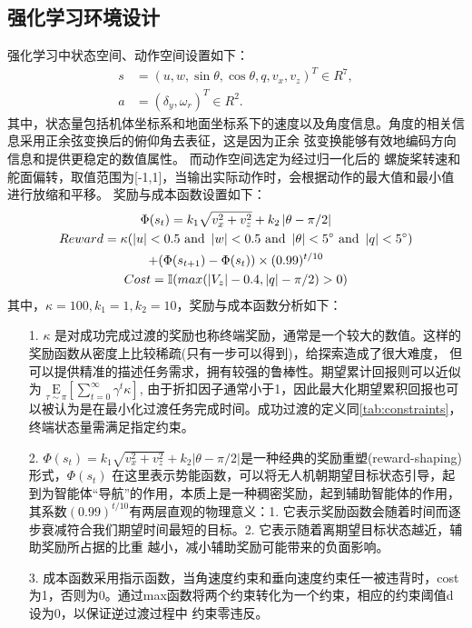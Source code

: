 \subsection{强化学习环境设计}
\label{chapter:env}
强化学习中状态空间、动作空间设置如下：
\begin{equation}
    \begin{aligned}
    s &= \left(u,w,\sin \theta , \cos \theta , q, v_{x},v_{z}\right)^{T} \in R^{7}, \\
    a &= \left(\delta_{y},\omega_{r}\right)^{T} \in R^{2}.
    \end{aligned}
\end{equation}
其中，状态量包括机体坐标系和地面坐标系下的速度以及角度信息。角度的相关信息采用正余弦变换后的俯仰角去表征，这是因为正余
弦变换能够有效地编码方向信息和提供更稳定的数值属性。
而动作空间选定为经过归一化后的
螺旋桨转速和舵面偏转，取值范围为[-1,1]，当输出实际动作时，会根据动作的最大值和最小值进行放缩和平移。
奖励与成本函数设置如下：
\begin{gather}
    \Phi (s_{t})=k_{1}\sqrt{v_{x}^{2}+v_{z}^{2}}+k_{2}\left | \theta-\pi/2 \right | \\\notag
    Reward=\kappa(\left | u \right | < 0.5 \ \text{and}\ \left | w \right | < 0.5\ \text{and}\ \left | \theta \right | < 5^{\circ}\ \text{and}\ \left | q \right | < 5^{\circ})\\ \notag
    +(\Phi (s_{t+1})-\Phi (s_{t}))\times (0.99)^{t/10}\\ \notag
    Cost=\mathbb I(max(\left | V_{z} \right |-0.4,\left | q \right |-\pi/2 )>0)  \notag
\end{gather}
其中，$\kappa=100,k_{1}=1,k_{2}=10$，奖励与成本函数分析如下：
\begin{itemize}
    \item [1.] $\kappa$ 是对成功完成过渡的奖励也称终端奖励，通常是一个较大的数值。这样的奖励函数从密度上比较稀疏(只有一步可以得到)，给探索造成了很大难度，
    但可以提供精准的描述任务需求，拥有较强的鲁棒性。期望累计回报则可以近似为
    $\underset{\tau \sim \pi }{\mathrm{E}}\left[\sum_{t=0}^{\infty} \gamma^{t}\kappa\right]$, 
    由于折扣因子通常小于1，因此最大化期望累积回报也可以被认为是在最小化过渡任务完成时间。成功过渡的定义同\autoref{tab:constraints}，终端状态量需满足指定约束。
    \item [2.] $\Phi (s_{t})=k_{1}\sqrt{v_{x}^{2}+v_{z}^{2}}+k_{2}\left | \theta-\pi/2 \right |$是一种经典的奖励重塑(reward-shaping)形式，$\Phi (s_{t})$
    在这里表示势能函数，可以将无人机朝期望目标状态引导，起到为智能体“导航”的作用，本质上是一种稠密奖励，起到辅助智能体的作用，
    其系数$(0.99)^{t/10}$有两层直观的物理意义：1. 它表示奖励函数会随着时间而逐步衰减符合我们期望时间最短的目标。2. 它表示随着离期望目标状态越近，辅助奖励所占据的比重
    越小，减小辅助奖励可能带来的负面影响。
    \item [3.] 成本函数采用指示函数，当角速度约束和垂向速度约束任一被违背时，cost为1，否则为0。通过max函数将两个约束转化为一个约束，相应的约束阈值d设为0，以保证逆过渡过程中
    约束零违反。
\end{itemize}

